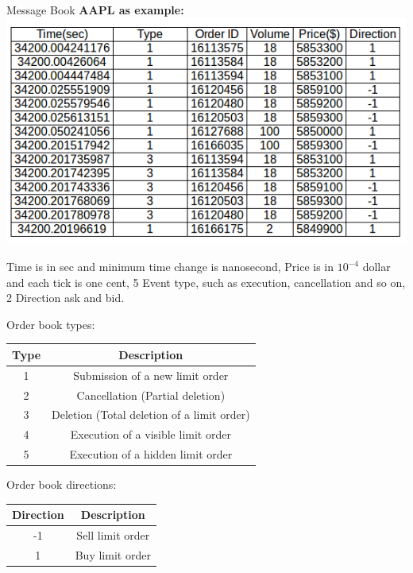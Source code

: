 \documentclass[xcolor={x11names,svgnames,dvipsnames}]{beamer}
\begin{document}
\begin{frame}
\begin{block}{Message Book}
\textbf{AAPL as example:}
\includegraphics[width=1\textwidth, height=0.6\textheight]{message_book_new.png}
\end{block}

Time is in sec and minimum time change is \alert{nanosecond}, Price is in $10^{-4}$ dollar and each tick is one cent, 5 Event type, such as execution, cancellation and so on, 2 Direction ask and bid. 

\end{frame}

\begin{frame}


\begin{block}{Order book types:}
\begin{table}
\centering
     \begin{tabular}{|c|c|}
     \hline  Type& Description \\ 
     \hline 1& Submission of a new limit order  \\ 
     \hline 2& Cancellation (Partial deletion) \\ 
     \hline 3 & Deletion (Total deletion of a limit order)  \\ 
     \hline 4&   Execution of a visible limit order    \\ 
     \hline 5&   Execution of a hidden limit order\\ 
     \hline 
     \end{tabular} 
\end{table}
\end{block}

\begin{block}{Order book directions:}

\begin{table}
\centering
     \begin{tabular}{|c|c|}
     \hline  Direction& Description \\ 
     \hline -1 &  Sell limit order \\ 
     \hline 1&  Buy limit order\\ 
     \hline
     \end{tabular} 
\end{table}
\end{block}



\end{frame}
\end{document}
